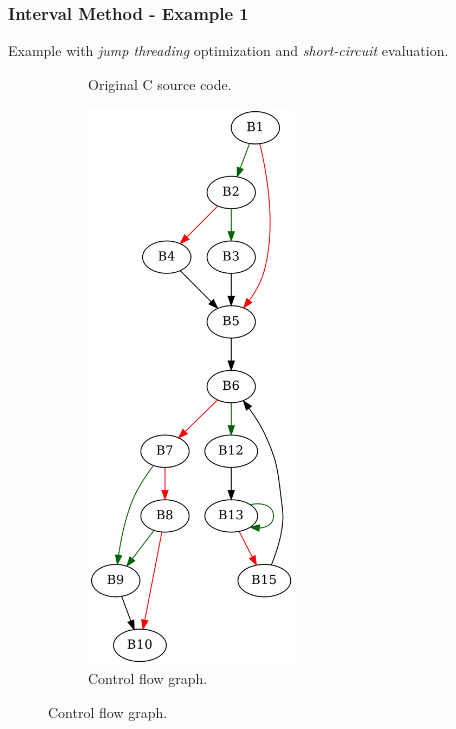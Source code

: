 

\clearpage

\subsubsection{Interval Method - Example 1}
\label{app:interval_example1}

Example with \textit{jump threading} optimization and \textit{short-circuit} evaluation.

\begin{figure}[htbp]
	\centering
	\begin{subfigure}[b]{0.30\textwidth}
		\centering
		
		\caption{Original C source code.}
	\end{subfigure}
	\begin{subfigure}[b]{0.50\textwidth}
		\centering
		\includegraphics[width=0.6\textwidth]{inc/appendices/examples/interval/example/sample/f.png}
		\caption{Control flow graph.}
	\end{subfigure}
\end{figure}

